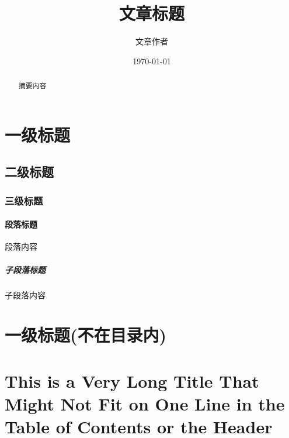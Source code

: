 \documentclass[UTF8]{ctexart} %
\title{文章标题}
\author{文章作者}
\date{\today}
\begin{document}
\maketitle %

\newpage

\begin{abstract}
    摘要内容
\end{abstract}

\newpage

\tableofcontents

\newpage

\section{一级标题}

\subsection{二级标题}

\subsubsection{三级标题}

\paragraph{段落标题}段落内容

\subparagraph{子段落标题}子段落内容

\section*{一级标题(不在目录内)}

\section[短标题]{This is a Very Long Title That Might Not Fit on One Line in the Table of Contents or the Header}
\end{document}
